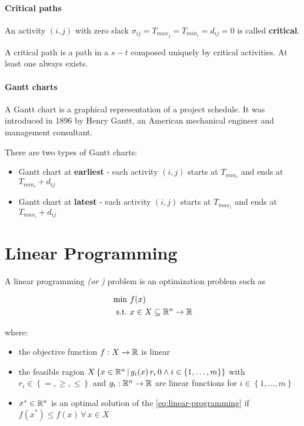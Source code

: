 \documentclass[english]{article}
\begin{document}
\paragraph{Critical paths}

An activity \(\left( i, j \right)\) with zero slack \(\sigma_{ij} = T_{max_j} = T_{min_i} = d_{ij} = 0\) is called \textbf{critical}.

A critical path is a path in a \(s-t\) composed uniquely by critical activities.
At least one always exists.

\paragraph{Gantt charts}

A Gantt chart is a graphical representation of a project schedule.
It was introduced in 1896 by Henry Gantt, an American mechanical engineer and management consultant.

There are two types of Gantt charts:

\begin{itemize}
  \item Gantt chart at \textbf{earliest} - each activity \(\left( i, j \right)\) starts at \(T_{min_i}\) and ends at \(T_{min_i} + d_{ij}\)
  \item Gantt chart at \textbf{latest} - each activity \(\left( i, j \right)\) starts at \(T_{max_i}\) and ends at \(T_{max_i} + d_{ij}\)
\end{itemize}

\clearpage

\section{Linear Programming}

A linear programming \textit{(or \LP)} problem is an optimization problem such as

\begin{gather}
  \begin{aligned}
    \min \         & f(x)                                  \\
    \text{s.t.} \  & x \in X \subseteq \mathbb{R}^n \rightarrow \mathbb{R}
  \end{aligned}
  \label{eq:linear-programming}
\end{gather}

where:

\begin{itemize}
  \item the objective function \(f: X \rightarrow \mathbb{R}\) is linear
  \item the feasible ragion \(X \left\{ x \in \mathbb{R}^n \, | \, g_i(x) \, r_i \, 0 \land i \in \left\{ 1, \ldots, m \right\}\right\}\) with \(r_i \in \left\{ =, \geq, \leq \right\}\) and \(g_i: \mathbb{R}^n \rightarrow \mathbb{R}\) are linear functions for \(i \in \left\{ 1, \ldots, m \right\}\)
  \item \(x^\ast \in \mathbb{R}^n\) is an optimal solution of the \LP \ref{eq:linear-programming} if \(f(x^\ast) \leq f(x) \, \forall \, x \in X\)
\end{itemize}
\end{document}

